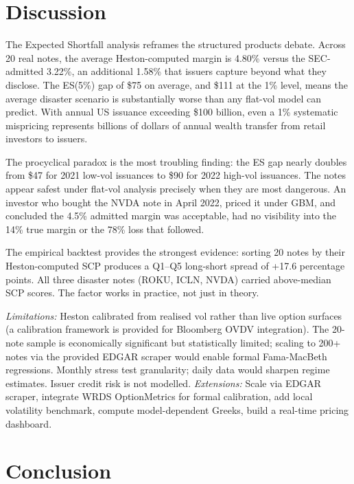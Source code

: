 \documentclass[12pt,a4paper]{article}
\begin{document}
\newpage
\section{Discussion}
\label{sec:discussion}

The Expected Shortfall analysis reframes the structured products debate. Across 20 real notes, the average Heston-computed margin is 4.80\% versus the SEC-admitted 3.22\%, an additional 1.58\% that issuers capture beyond what they disclose. The ES(5\%) gap of \$75 on average, and \$111 at the 1\% level, means the average disaster scenario is substantially worse than any flat-vol model can predict. With annual US issuance exceeding \$100 billion, even a 1\% systematic mispricing represents billions of dollars of annual wealth transfer from retail investors to issuers.

The procyclical paradox is the most troubling finding: the ES gap nearly doubles from \$47 for 2021 low-vol issuances to \$90 for 2022 high-vol issuances. The notes appear safest under flat-vol analysis precisely when they are most dangerous. An investor who bought the NVDA note in April 2022, priced it under GBM, and concluded the 4.5\% admitted margin was acceptable, had no visibility into the 14\% true margin or the 78\% loss that followed.

The empirical backtest provides the strongest evidence: sorting 20 notes by their Heston-computed SCP produces a Q1--Q5 long-short spread of +17.6 percentage points. All three disaster notes (ROKU, ICLN, NVDA) carried above-median SCP scores. The factor works in practice, not just in theory.

\textit{Limitations:} Heston calibrated from realised vol rather than live option surfaces (a calibration framework is provided for Bloomberg OVDV integration). The 20-note sample is economically significant but statistically limited; scaling to 200+ notes via the provided EDGAR scraper would enable formal Fama-MacBeth regressions. Monthly stress test granularity; daily data would sharpen regime estimates. Issuer credit risk is not modelled. \textit{Extensions:} Scale via EDGAR scraper, integrate WRDS OptionMetrics for formal calibration, add local volatility benchmark, compute model-dependent Greeks, build a real-time pricing dashboard.

\newpage
\section{Conclusion}
\end{document}
